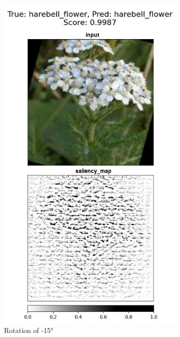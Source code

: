 \begin{figure}
\begin{subfigure}{.18\textwidth}
\end{subfigure}
 \begin{subfigure}{.18\textwidth}
    \centering
    \includegraphics[width=\textwidth]{results/augment-img/20-2-64-rotation--15-harebell_flower-harebell_flower_vert.jpg}
    \caption{Rotation of -15°}\label{fig:rotated-harebell}
\end{subfigure}
 \begin{subfigure}{.22\textwidth}

\end{subfigure}
\end{figure}
